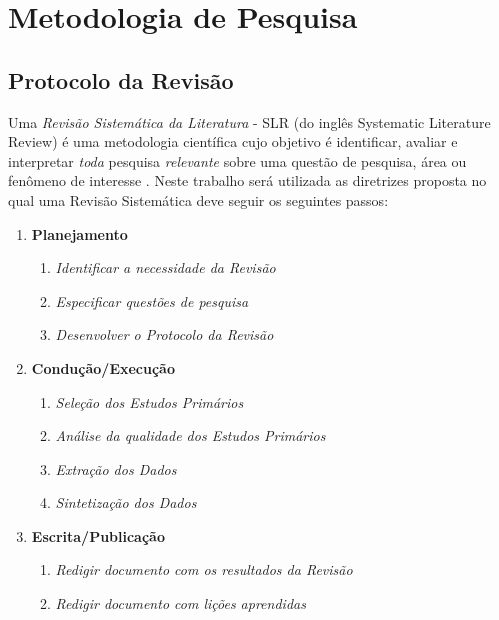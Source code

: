 \documentclass[12pt]{article}
\begin{document}
\section{Metodologia de Pesquisa}
\label{sec:metodologia}

\subsection{Protocolo da Revisão}
\label{subsec:protocolo}

Uma \textit{Revisão Sistemática da Literatura} - SLR (do inglês Systematic Literature Review) é uma
metodologia científica cujo objetivo é identificar, avaliar e interpretar
\textit{toda} pesquisa \textit{relevante} sobre uma questão de pesquisa, área
ou fenômeno de interesse \cite{keele2007guidelines,wohlin2012experimentation}. Neste trabalho
será utilizada as diretrizes proposta \cite{keele2007guidelines} no qual uma
Revisão Sistemática deve seguir os seguintes passos:

\begin{enumerate}
  \item \textbf{Planejamento}
  \begin{enumerate}
    \item \textit{Identificar a necessidade da Revisão}
    \item \textit{Especificar questões de pesquisa}
    \item \textit{Desenvolver o Protocolo da Revisão}
  \end{enumerate}
  \item \textbf{Condução/Execução}
  \begin{enumerate}
    \item \textit{Seleção dos Estudos Primários}
    \item \textit{Análise da qualidade dos Estudos Primários}
     \item \textit{Extração dos Dados}
     \item \textit{Sintetização dos Dados}
   \end{enumerate}
  \item \textbf{Escrita/Publicação}
  \begin{enumerate}
    \item \textit{Redigir documento com os resultados da Revisão}
    \item \textit{Redigir documento com lições aprendidas}
  \end{enumerate}
\end{enumerate}
\end{document}
